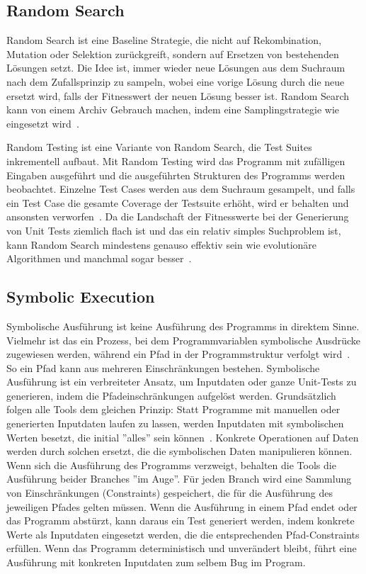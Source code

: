 \documentclass{article}
\begin{document}
\subsection{Random Search}
Random Search ist eine Baseline Strategie, die nicht auf Rekombination, Mutation oder Selektion zurückgreift, sondern auf Ersetzen von bestehenden Lösungen setzt. Die Idee ist, immer wieder neue Lösungen aus dem Suchraum nach dem Zufallsprinzip zu sampeln, wobei eine vorige Lösung durch die neue ersetzt wird, falls der Fitnesswert der neuen Lösung besser ist. Random Search kann von einem Archiv Gebrauch machen, indem eine Samplingstrategie wie  eingesetzt wird~\cite{Campos2017}.

Random Testing ist eine Variante von Random Search, die Test Suites inkrementell aufbaut. Mit Random Testing wird das Programm mit zufälligen Eingaben ausgeführt und die ausgeführten Strukturen des Programms werden beobachtet. Einzelne Test Cases werden aus dem Suchraum gesampelt, und falls ein Test Case die gesamte Coverage der Testsuite erhöht, wird er behalten und ansonsten verworfen~\cite{Campos2017}. Da die Landschaft der Fitnesswerte bei der Generierung von Unit Tests ziemlich flach ist und das ein relativ simples Suchproblem ist, kann Random Search mindestens genauso effektiv sein wie evolutionäre Algorithmen und manchmal sogar besser~\cite{Shamshiri2015a}. 

\subsection{Symbolic Execution}
Symbolische Ausführung ist keine Ausführung des Programms in direktem Sinne. Vielmehr ist das ein Prozess, bei dem Programmvariablen symbolische Ausdrücke zugewiesen werden, während ein Pfad in der Programmstruktur verfolgt wird~\cite{McMinn_2004}. So ein Pfad kann aus mehreren Einschränkungen bestehen. Symbolische Ausführung ist ein verbreiteter Ansatz, um Inputdaten oder ganze Unit-Tests zu generieren, indem die Pfadeinschränkungen aufgelöst werden.  Grundsätzlich folgen alle Tools dem gleichen Prinzip: Statt Programme mit manuellen oder generierten Inputdaten laufen zu lassen, werden Inputdaten mit symbolischen Werten besetzt, die initial ''alles'' sein können~\cite{cadar2008klee}. Konkrete Operationen auf Daten werden durch solchen ersetzt, die die symbolischen Daten manipulieren können. Wenn sich die Ausführung des Programms verzweigt, behalten die Tools die Ausführung beider Branches ''im Auge''. Für jeden Branch wird eine Sammlung von Einschränkungen (Constraints) gespeichert, die für die Ausführung des jeweiligen Pfades gelten müssen. Wenn die Ausführung in einem Pfad endet oder das Programm abstürzt, kann daraus ein Test generiert werden, indem konkrete Werte als Inputdaten eingesetzt werden, die die entsprechenden Pfad-Constraints erfüllen. Wenn das Programm deterministisch und unverändert bleibt, führt eine Ausführung mit konkreten Inputdaten zum selbem Bug im Program. 
\end{document}
